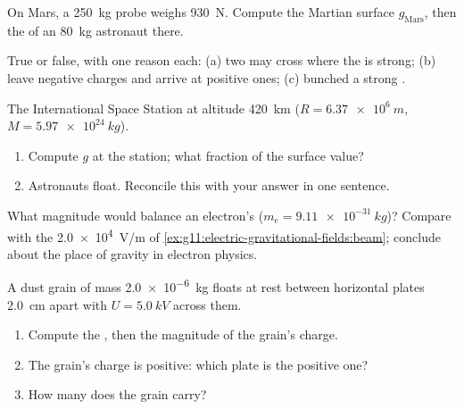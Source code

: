 \begin{exercise}[$\star$]\label{exo:g11:electric-gravitational-fields:4}
On Mars, a \qty{250}{kg} probe weighs \qty{930}{N}. Compute the Martian
surface  $g_{\text{Mars}}$, then the  of an \qty{80}{kg}
astronaut there.
\end{exercise}

\begin{exercise}[$\star$]\label{exo:g11:electric-gravitational-fields:5}
True or false, with one reason each: (a) two  may cross
where the  is strong; (b)  leave negative charges and
arrive at positive ones; (c) bunched   a strong .
\end{exercise}

\begin{exercise}[$\star\star$]\label{exo:g11:electric-gravitational-fields:6}
The International Space Station  at altitude \qty{420}{km}
($R = \qty{6.37e6}{m}$, $M = \qty{5.97e24}{kg}$).
\begin{enumerate}
  \item Compute $g$ at the station; what fraction of the surface value?
  \item Astronauts float. Reconcile this with your answer in one
        sentence.
\end{enumerate}
\end{exercise}

\begin{exercise}[$\star\star$]\label{exo:g11:electric-gravitational-fields:7}
What  magnitude would balance an electron's 
($m_e = \qty{9.11e-31}{kg}$)? Compare with the \qty{2.0e4}{V/m} of
\cref{ex:g11:electric-gravitational-fields:beam}; conclude about the
place of gravity in electron physics.
\end{exercise}

\begin{exercise}[$\star\star$]\label{exo:g11:electric-gravitational-fields:8}
A dust grain of mass \qty{2.0e-6}{kg} floats at rest between horizontal
plates \qty{2.0}{cm} apart with $U = \qty{5.0}{kV}$ across them.
\begin{enumerate}
  \item Compute the , then the magnitude of the grain's charge.
  \item The grain's charge is positive: which plate is the positive one?
  \item How many  does the grain carry?
\end{enumerate}
\end{exercise}

